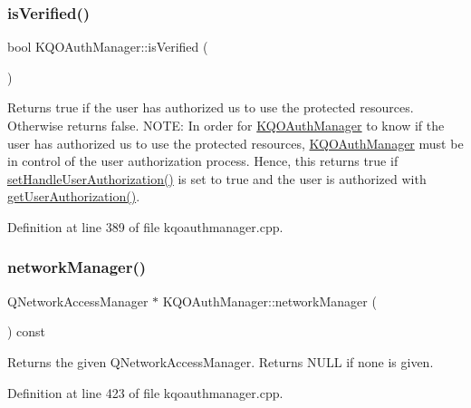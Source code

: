 \subsubsection{\texorpdfstring{is\+Verified()}{isVerified()}}
{\footnotesize\ttfamily bool K\+Q\+O\+Auth\+Manager\+::is\+Verified (\begin{DoxyParamCaption}{ }\end{DoxyParamCaption})}

Returns true if the user has authorized us to use the protected resources. Otherwise returns false. N\+O\+TE\+: In order for \hyperlink{class_k_q_o_auth_manager}{K\+Q\+O\+Auth\+Manager} to know if the user has authorized us to use the protected resources, \hyperlink{class_k_q_o_auth_manager}{K\+Q\+O\+Auth\+Manager} must be in control of the user authorization process. Hence, this returns true if \hyperlink{class_k_q_o_auth_manager_a55409df469317596b81ab50823eb6a97}{set\+Handle\+User\+Authorization()} is set to true and the user is authorized with \hyperlink{class_k_q_o_auth_manager_ab33a5aead44d35476d13152f4a35700b}{get\+User\+Authorization()}. 

Definition at line 389 of file kqoauthmanager.\+cpp.

\mbox{\label{class_k_q_o_auth_manager_a0e798ce8a270552a490369d6afd35e2d}} 
\subsubsection{\texorpdfstring{network\+Manager()}{networkManager()}}
{\footnotesize\ttfamily Q\+Network\+Access\+Manager $\ast$ K\+Q\+O\+Auth\+Manager\+::network\+Manager (\begin{DoxyParamCaption}{ }\end{DoxyParamCaption}) const}

Returns the given Q\+Network\+Access\+Manager. Returns N\+U\+LL if none is given. 

Definition at line 423 of file kqoauthmanager.\+cpp.

\mbox{\label{class_k_q_o_auth_manager_ab605e437fb159d0a20e2e92601d679fe}} 
